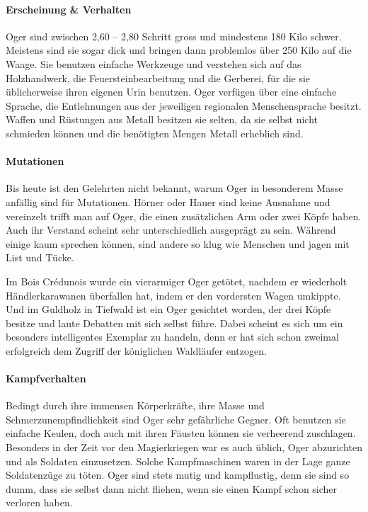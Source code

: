 \documentclass[12pt,twoside,twocolumn,openany]{book}
\begin{document}
\paragraph{Erscheinung \& Verhalten}
Oger sind zwischen 2,60 – 2,80 Schritt gross und mindestens 180 Kilo schwer. Meistens sind sie sogar dick und bringen dann problemlos über 250 Kilo auf die Waage. Sie benutzen einfache Werkzeuge und verstehen sich auf das Holzhandwerk, die Feuersteinbearbeitung und die Gerberei, für die sie üblicherweise ihren eigenen Urin benutzen.
Oger verfügen über eine einfache Sprache, die Entlehnungen aus der jeweiligen regionalen Menschensprache besitzt. Waffen und Rüstungen aus Metall besitzen sie selten, da sie selbst nicht schmieden können und die benötigten Mengen Metall erheblich sind.

\paragraph{Mutationen}
Bis heute ist den Gelehrten nicht bekannt, warum Oger in besonderem Masse anfällig sind für Mutationen. Hörner oder Hauer sind keine Ausnahme und vereinzelt trifft man auf Oger, die einen zusätzlichen Arm oder zwei Köpfe haben. Auch ihr Verstand scheint sehr unterschiedlich ausgeprägt zu sein. Während einige kaum sprechen können, sind andere so klug wie Menschen und jagen mit List und Tücke.

Im Bois Crédunois wurde ein vierarmiger Oger getötet, nachdem er wiederholt Händlerkarawanen überfallen hat, indem er den vordersten Wagen umkippte. Und im Guldholz in Tiefwald ist ein Oger gesichtet worden, der drei Köpfe besitze und laute Debatten mit sich selbst führe. Dabei scheint es sich um ein besonders intelligentes Exemplar zu handeln, denn er hat sich schon zweimal erfolgreich dem Zugriff der königlichen Waldläufer entzogen.




\paragraph{Kampfverhalten}
Bedingt durch ihre immensen Körperkräfte, ihre Masse und Schmerzunempfindlichkeit sind Oger sehr gefährliche Gegner. Oft benutzen sie einfache Keulen, doch auch mit ihren Fäusten können sie verheerend zuschlagen. Besonders in der Zeit vor den Magierkriegen war es auch üblich, Oger abzurichten und als Soldaten einzusetzen. Solche Kampfmaschinen waren in der Lage ganze  Soldatenzüge zu töten. Oger sind stets mutig und kampflustig, denn sie sind so dumm, dass sie selbst dann nicht fliehen, wenn sie einen Kampf schon sicher verloren haben.
\end{document}
